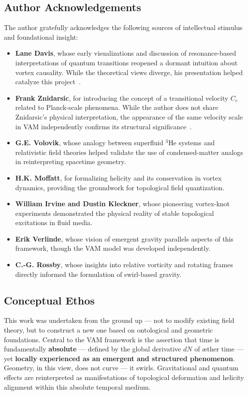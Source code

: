 \documentclass[preprint]{revtex4-2}
\begin{document}
            \subsection*{Author Acknowledgements}
            The author gratefully acknowledges the following sources of intellectual stimulus and foundational insight:
        
            \begin{itemize}
                \item \textbf{Lane Davis}, whose early visualizations and discussion of resonance-based interpretations of quantum transitions reopened a dormant intuition about vortex causality. While the theoretical views diverge, his presentation helped catalyze this project~\cite{davis2010cold}.
                \item \textbf{Frank Znidarsic}, for introducing the concept of a transitional velocity \( C_e \) related to Planck-scale phenomena. While the author does not share Znidarsic's physical interpretation, the appearance of the same velocity scale in VAM independently confirms its structural significance~\cite{znidarsic2012control}.
                \item \textbf{G.E. Volovik}, whose analogy between superfluid \( ^3 \)He systems and relativistic field theories helped validate the use of condensed-matter analogs in reinterpreting spacetime geometry.
                \item \textbf{H.K. Moffatt}, for formalizing helicity and its conservation in vortex dynamics, providing the groundwork for topological field quantization.
                \item \textbf{William Irvine and Dustin Kleckner}, whose pioneering vortex-knot experiments demonstrated the physical reality of stable topological excitations in fluid media.
                \item \textbf{Erik Verlinde}, whose vision of emergent gravity parallels aspects of this framework, though the VAM model was developed independently.
                \item \textbf{C.-G. Rossby}, whose insights into relative vorticity and rotating frames directly informed the formulation of swirl-based gravity.
            \end{itemize}
        
            \subsection*{Conceptual Ethos}
            This work was undertaken from the ground up — not to modify existing field theory, but to construct a new one based on ontological and geometric foundations. Central to the VAM framework is the assertion that time is fundamentally \textbf{absolute} — defined by the global derivative \( dN \) of æther time — yet \textbf{locally experienced as an emergent and structured phenomenon}. Geometry, in this view, does not curve — it swirls. Gravitational and quantum effects are reinterpreted as manifestations of topological deformation and helicity alignment within this absolute temporal medium.
\end{document}
